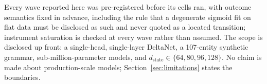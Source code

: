 Every wave reported here was pre-registered before its cells ran, with
outcome semantics fixed in advance, including the rule that a degenerate
sigmoid fit on flat data must be disclosed as such and never quoted as a
located transition; instrument saturation is checked at every wave rather
than assumed. The scope is disclosed up front: a single-head, single-layer
DeltaNet, a 107-entity synthetic grammar, sub-million-parameter models,
and $d_{\mathrm{state}} \in \{64, 80, 96, 128\}$. No claim is made about
production-scale models; Section~\ref{sec:limitations} states the
boundaries.
